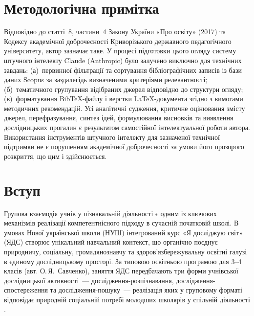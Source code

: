 \documentclass[a4paper,14pt]{extarticle}
\begin{document}
\setcounter{page}{2}

\tableofcontents
\newpage

\section*{Методологічна примітка}

Відповідно до статті~8, частини~4 Закону України «Про освіту» (2017) та Кодексу академічної доброчесності Криворізького державного педагогічного університету, автор зазначає таке. У процесі підготовки цього огляду систему штучного інтелекту Claude (Anthropic) було залучено виключно для технічних завдань: (а)~первинної фільтрації та сортування бібліографічних записів із бази даних Scopus за заздалегідь визначеними критеріями релевантності; (б)~тематичного групування відібраних джерел відповідно до структури огляду; (в)~форматування BibTeX-файлу і верстки LaTeX-документа згідно з вимогами методичних рекомендацій. Усі аналітичні судження, критичне оцінювання змісту джерел, перефразування, синтез ідей, формулювання висновків та виявлення дослідницьких прогалин є результатом самостійної інтелектуальної роботи автора. Використання інструментів штучного інтелекту для зазначеної технічної підтримки не є порушенням академічної доброчесності за умови його прозорого розкриття, що цим і здійснюється.

\newpage

\section{Вступ}

Групова взаємодія учнів у пізнавальній діяльності є одним із ключових механізмів реалізації компетентнісного підходу в сучасній початковій школі. В умовах Нової української школи (НУШ) інтегрований курс «Я досліджую світ» (ЯДС) створює унікальний навчальний контекст, що органічно поєднує природничу, соціальну, громадянознавчу та здоров'язбережувальну освітні галузі в єдиному дослідницькому просторі. За типовою освітньою програмою для 3--4 класів (авт. О.\,Я.~Савченко), заняття ЯДС передбачають три форми учнівської дослідницької активності~--- дослідження-розпізнавання, дослідження-спостереження та дослідження-пошуку~--- реалізація яких у груповому форматі відповідає природній соціальній потребі молодших школярів у спільній діяльності \parencite{Savchenko2019}.
\end{document}
